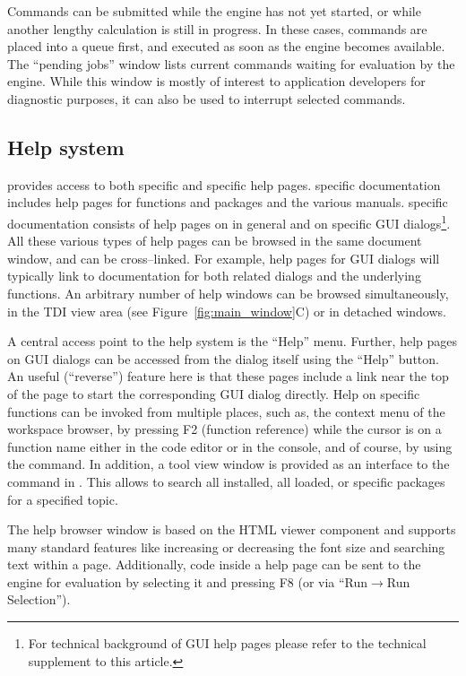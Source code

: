 Commands can be submitted while the  engine
has not yet started, or while another lengthy calculation is still
in progress. In these cases, commands are placed into a queue first, and
executed as soon as the  engine becomes
available. The ``pending jobs'' window lists current  commands waiting for
evaluation by the  engine. While this
window is mostly of interest to application developers for diagnostic
purposes, it can also be used to interrupt selected commands.

\subsection{Help system}
\label{sec:help_system}

 provides access to both  specific and 
 specific help pages.
 specific documentation includes help pages for functions and packages 
and the various  manuals.  specific documentation consists of
help pages on  in general and on specific GUI dialogs\footnote{For technical 
background of  GUI help pages please refer to the technical supplement to this article.}. 
All these various types of help pages can be browsed in the same document 
window, and can be cross--linked. For example, help pages for
 GUI dialogs will typically link to documentation for both
related  dialogs and the underlying  functions.
An arbitrary number of help windows can be browsed simultaneously, in the
TDI view area (see Figure~\ref{fig:main_window}C) or in detached windows.

A central access point to the help system is the ``Help'' menu. Further, help pages on
 GUI dialogs can be accessed from the dialog itself using the
``Help'' button. An useful (``reverse'') feature here is that these pages include 
a link near the top of the page to start the corresponding GUI dialog directly.
Help on  specific functions can be invoked from multiple places, 
such as, the context menu of the workspace browser, by pressing F2 (function
reference) while the cursor is on a function name either in the code editor or 
in the  console, and of course, by using the  
command. In addition, a tool view window is provided as an interface to the
 command in . This allows to search all installed, 
all loaded, or specific  packages for a specified topic.

The help browser window is based on the 
HTML viewer component and supports many standard
features like increasing or decreasing the font size and searching text
within a page. Additionally,  code inside a help
page can be sent to the  engine for
evaluation by selecting it and pressing F8 (or via ``Run$\rightarrow$Run
Selection'').

